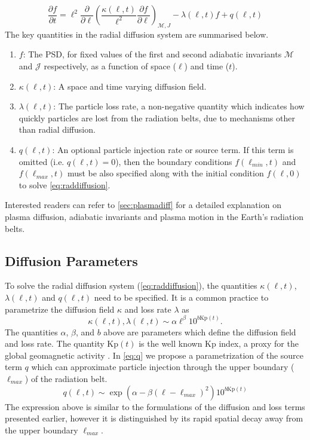 %
\begin{equation}\label{eq:raddiffusion}
  \frac{\partial{f}}{\partial{t}} = \ell^2 \frac{\partial}{\partial{\ell}} \left( 
    \frac{\kappa(\ell, t)}{\ell^{2}} \frac{\partial{f}}{\partial{\ell}}
  \right)_{\mathcal{M}, J} - \lambda(\ell, t) f + q(\ell, t)
\end{equation}
%
The key quantities in the radial diffusion system are summarised below.
%
\begin{enumerate}
\item $f$: The PSD, for fixed values of the first and second adiabatic invariants $\mathcal{M}$ 
      and $\mathcal{J}$ respectively, as a function of space ($\ell$) and time ($t$).
\item $\kappa(\ell, t)$: A space and time varying diffusion field.
\item $\lambda(\ell, t)$: The particle loss rate, a non-negative quantity which indicates how 
quickly particles are lost from the radiation belts, due to mechanisms other than radial diffusion.
\item $q(\ell, t)$: An optional particle injection rate or source term. If this term is omitted 
      (i.e. $q(\ell, t) = 0$), then the boundary conditions $f(\ell_{min}, t)$ and 
      $f(\ell_{max}, t)$ must be also specified along with the initial condition $f(\ell, 0)$ 
      to solve \cref{eq:raddiffusion}. 
\end{enumerate}
%
Interested readers can refer to \cref{sec:plasmadiff} for a detailed explanation on 
plasma diffusion, adiabatic invariants and plasma motion in the Earth's radiation belts. 

\subsection{Diffusion Parameters}\label{sec:radDiffParams}

To solve the radial diffusion system (\cref{eq:raddiffusion}), the quantities $\kappa(\ell, t)$, 
$\lambda(\ell, t)$ and $q(\ell, t)$ need to be specified. It is a common practice 
\citetext{see \citealp{GRL:GRL10762}, \citealp{JGRA:JGRA15067}, \citealp{JGRA:JGRA18021} and
\citealp{GRL:GRL22815}} to parametrize the diffusion field $\kappa$ and loss rate $\lambda$ as 
%
\begin{equation}\label{eq:paramExp}
  \kappa(\ell, t), \lambda(\ell, t) \sim \alpha \ell^{\beta} 10^{b \mathrm{Kp}(t)}.
\end{equation}
%
The quantities $\alpha$, $\beta$, and $b$ above are parameters which define the diffusion field and 
loss rate. The quantity $\mathrm{Kp}(t)$ is the well known Kp index, a proxy for the global 
geomagnetic activity \citep{BartelsKp}.
%
In \cref{eq:q} we propose a parametrization of the source term $q$ which can approximate particle 
injection through the upper boundary ($\ell_{max}$) of the radiation belt. 
%
\begin{equation}\label{eq:q}
q(\ell,t)  \sim \exp(\alpha - \beta (\ell - \ell_{max})^2) 10^{b \mathrm{Kp}(t)}
\end{equation}
%
The expression above is similar to the formulations of the diffusion and loss terms presented 
earlier, however it is distinguished by its rapid spatial decay away from the upper boundary 
$\ell_{max}$.  

